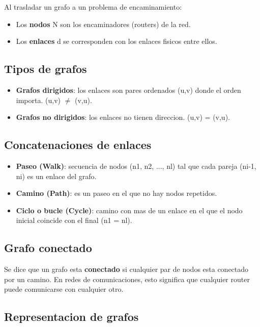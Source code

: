 Al trasladar un grafo a un problema de encaminamiento:
\begin{itemize}
    \item Los \textbf{nodos} N son los encaminadores (routers) de la red.
    \item Los \textbf{enlaces} d se corresponden con los enlaces fisicos entre ellos.
\end{itemize}

\subsection{Tipos de grafos}

\begin{itemize}
    \item \textbf{Grafos dirigidos}: los enlaces son pares ordenados (u,v) donde el
    orden importa. (u,v) $\neq$ (v,u).
    \item \textbf{Grafos no dirigidos}: los enlaces no tienen direccion. (u,v) = (v,u).
\end{itemize}

\subsection{Concatenaciones de enlaces}

\begin{itemize}
    \item \textbf{Paseo (Walk)}: secuencia de nodos (n1, n2, ..., nl) tal que cada pareja
    (ni-1, ni) es un enlace del grafo.
    \item \textbf{Camino (Path)}: es un paseo en el que no hay nodos repetidos.
    \item \textbf{Ciclo o bucle (Cycle)}: camino con mas de un enlace en el que el nodo
    inicial coincide con el final (n1 = nl).
\end{itemize}

\subsection{Grafo conectado}

Se dice que un grafo esta \textbf{conectado} si cualquier par de nodos esta conectado
por un camino. En redes de comunicaciones, esto significa que cualquier router
puede comunicarse con cualquier otro.

\subsection{Representacion de grafos}

